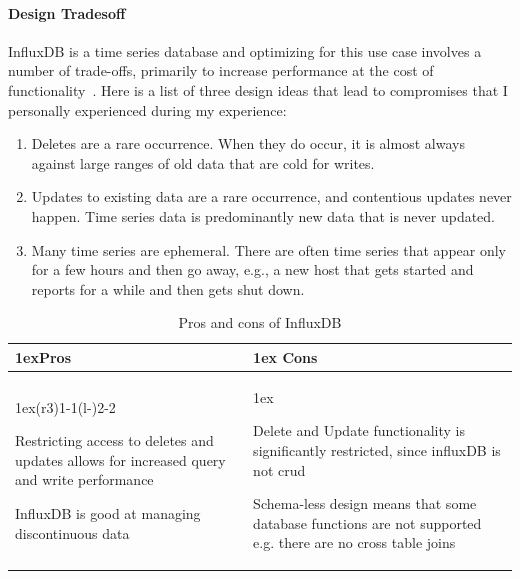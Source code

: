 \paragraph{Design Tradesoff}
InfluxDB is a time series database and optimizing for this use case involves a number of trade-offs, primarily to increase performance at the cost of functionality~\cite{Misc:influx_docs}. Here is a list of three design ideas that lead to compromises that I personally experienced during my experience:

\begin{enumerate}
    \item Deletes are a rare occurrence. When they do occur, it is almost always against large ranges of old data that are cold for writes.
    \item Updates to existing data are a rare occurrence, and contentious updates never happen. Time series data is predominantly new data that is never updated.
    \item Many time series are ephemeral. There are often time series that appear only for a few hours and then go away, e.g., a new host that gets started and reports for a while and then gets shut down.
\end{enumerate}


\begin{table}[ht]
    \begin{tabularx}{\linewidth}{>{\parskip1ex}X@{\kern4\tabcolsep}>{\parskip1ex}X}
        \toprule
        \hfil\bfseries Pros
         &
        \hfil\bfseries Cons
        \\\cmidrule(r{3\tabcolsep}){1-1}\cmidrule(l{-\tabcolsep}){2-2}

        Restricting access to deletes and updates allows for increased query and write performance\par
        InfluxDB is good at managing discontinuous data\par

         &

        Delete and Update functionality is significantly restricted, since influxDB is not \acs{crud} \par
        Schema-less design means that some database functions are not supported e.g. there are no cross table joins\par
        \\\bottomrule
    \end{tabularx}
    \caption{Pros and cons of InfluxDB}
\end{table}

